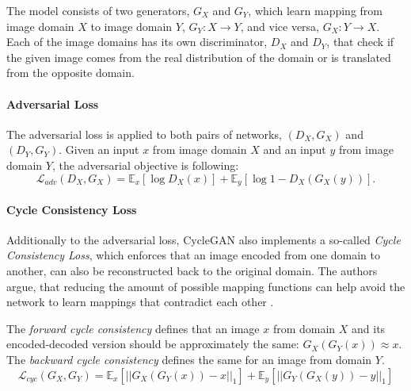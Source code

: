 \documentclass[12pt]{report}
\begin{document}
The model consists of two generators, $G_{X}$ and $G_{Y}$, which learn mapping from image domain $X$ to image domain $Y$, $G_{Y}: X \rightarrow Y$, and vice versa, $G_{X}: Y \rightarrow X$. Each of the image domains has its own discriminator, $D_{X}$ and $D_{Y}$, that check if the given image comes from the real distribution of the domain or is translated from the opposite domain.

\paragraph{Adversarial Loss}
The adversarial loss is applied to both pairs of networks, $(D_{X}, G_{X})$ and $(D_{Y}, G_{Y})$. Given an input $x$ from image domain $X$ and an input $y$ from image domain $Y$, the adversarial objective is following:
\begin{equation}
\mathcal{L}_{adv}(D_{X},G_{X}) = \mathbb{E}_{x}[\log D_{X}(x)] + \mathbb{E}_{y}[\log 1 - D_{X}(G_{X}(y))].
\label{eq:cyclegan_adv}
\end{equation}

\paragraph{Cycle Consistency Loss}
Additionally to the adversarial loss, CycleGAN also implements a so-called \emph{Cycle Consistency Loss}, which enforces that an image encoded from one domain to another, can also be reconstructed back to the original domain. The authors argue, that reducing the amount of possible mapping functions can help avoid the network to learn mappings that contradict each other \cite{zhu_unpaired_2017}.

\pagebreak
The \textit{forward cycle consistency} defines that an image $x$ from domain $X$ and its encoded-decoded version should be approximately the same: $G_{X}(G_{Y}(x)) \approx x$. The \textit{backward cycle consistency} defines the same for an image from domain $Y$.
\begin{equation}
\mathcal{L}_{cyc}(G_{X},G_{Y}) = \mathbb{E}_{x}[||G_{X}(G_{Y}(x)) - x||_{1}] + \mathbb{E}_{y}[||G_{Y}(G_{X}(y)) - y||_{1}]
\label{eq:cyclegan_cycle}
\end{equation}
\end{document}
